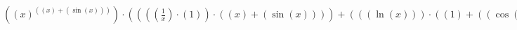 \documentclass{article}
\begin{document}
$((x)^{((x) + (\sin{(x)}))})\cdot((((\frac{1}{x})\cdot(1))\cdot((x) + (\sin{(x)}))) + (((\ln{(x)}))\cdot((1) + ((\cos{(x)})\cdot(1)))))$
\end{document}
